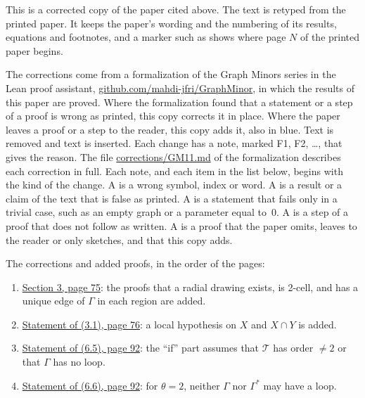 
This is a corrected copy of the paper cited above. The text is retyped from the printed paper.
It keeps the paper's wording and the numbering of its results, equations and footnotes, and a
marker such as  shows where page $N$ of the printed paper begins.

The corrections come from a formalization of the Graph Minors series in the Lean proof
assistant, \href{https://github.com/mahdi-jfri/GraphMinor}{github.com/mahdi-jfri/GraphMinor},
in which the results of this paper are proved. Where the formalization found that a statement
or a step of a proof is wrong as printed, this copy corrects it in place. Where the paper leaves a proof or a step to the reader, this copy adds it, also in blue. Text  is removed and text  is inserted. Each change has a note, marked
\textcolor{fixcolor}{\sffamily F1}, \textcolor{fixcolor}{\sffamily F2}, \dots, that gives the
reason. The file
\href{https://github.com/mahdi-jfri/GraphMinor/blob/main/corrections/GM11.md}{corrections/GM11.md}
of the formalization describes each correction in full. Each note, and each item in the list below, begins with the kind of the change. A  is a wrong symbol, index or word. A  is a result or a claim of the text that is false as printed. A  is a statement that fails only in a trivial case, such as an empty graph or a parameter equal to~$0$. A  is a step of a proof that does not follow as written. A  is a proof that the paper omits, leaves to the reader or only sketches, and that this copy adds.

The corrections and added proofs, in the order of the pages:
\begin{enumerate}\setlength{\itemsep}{1pt}
\item {}\hyperref[fix:radial-proof-added]{Section 3, page 75}: the proofs that a radial drawing exists, is 2-cell, and has a unique edge of $\Gamma$ in each region are added.
\item {}\hyperref[fix:3.1]{Statement of (3.1), page 76}: a local hypothesis on $X$ and $X\cap Y$ is added.
\item {}\hyperref[fix:6.5]{Statement of (6.5), page 92}: the ``if'' part assumes that $\mathscr{T}$ has order $\neq 2$ or that $\Gamma$ has no loop.
\item {}\hyperref[fix:6.6]{Statement of (6.6), page 92}: for $\theta=2$, neither $\Gamma$ nor $\Gamma^*$ may have a loop.
\end{enumerate}
